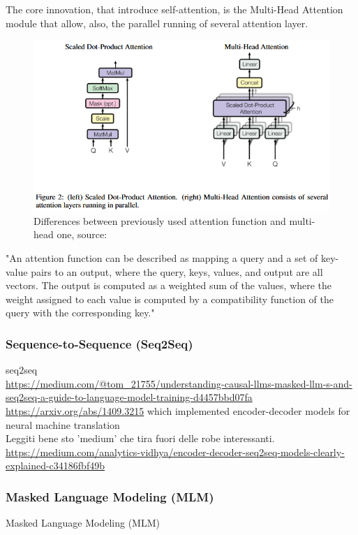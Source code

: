 \documentclass[12pt]{article}
\begin{document}
The core innovation, that introduce self-attention, is the Multi-Head Attention module that allow, also, the parallel running of several attention layer.
	\begin{figure}[H]
    \centering
            \includegraphics[width=1\textwidth]{attention.png}
    \caption{Differences between previously used attention function and multi-head one, source: \cite{vaswani2023attentionneed}}
    \end{figure}
"An attention function can be described as mapping a query and a set of key-value pairs to an output, where the query, keys, values, and output are all vectors. The output is computed as a weighted sum of the values, where the weight assigned to each value is computed by a compatibility function of the query with the corresponding key."\cite{vaswani2023attentionneed}
    
    	\subsubsection{Sequence-to-Sequence (Seq2Seq)}
seq$2$seq\\ \url{https://medium.com/@tom_21755/understanding-causal-llms-masked-llm-s-and-seq2seq-a-guide-to-language-model-training-d4457bbd07fa}\\
\url{https://arxiv.org/abs/1409.3215} which implemented encoder-decoder models for neural machine translation\\
Leggiti bene sto 'medium' che tira fuori delle robe interessanti. 
\url{https://medium.com/analytics-vidhya/encoder-decoder-seq2seq-models-clearly-explained-c34186fbf49b}
    	
        \subsubsection{Masked Language Modeling (MLM)}    	
    	Masked Language Modeling (MLM) \cite{devlin2019bertpretrainingdeepbidirectional}
    	
\end{document}
